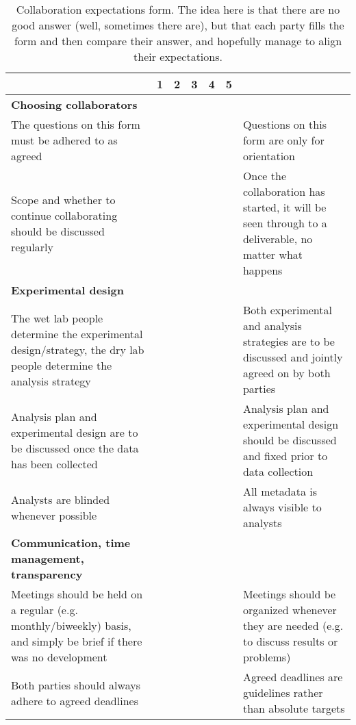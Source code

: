 \setlength\extrarowheight{4pt}

\begin{table}[!ht]
   \caption{Collaboration expectations form. The idea here is that there are no good answer (well, sometimes there are), but that each party fills the form and then compare their answer, and hopefully manage to align their expectations.}
    \label{form}
    \raggedleft
    \begin{adjustbox}{max width=\textwidth}
    \begin{tabular}{|p{3in}|l|l|l|l|l|p{3in}|}
    \hline
        ~ & 1 & 2 & 3 & 4 & 5 & ~ \tabularnewline \hline
        \textbf{Choosing collaborators} & ~ & ~ & ~ & ~ & ~ & ~ \tabularnewline \hline
        The questions on this form must be adhered to as agreed & ~ & ~ & ~ & ~ & ~ & Questions on this form are only for orientation \\ \hline
        Scope and whether to continue collaborating should be discussed regularly & ~ & ~ & ~ & ~ & ~ & Once the collaboration has started, it will be seen through to a deliverable, no matter what happens \\ \hline
        \textbf{Experimental design} & ~ & ~ & ~ & ~ & ~ & ~ \\ \hline
        The wet lab people determine the experimental design/strategy, the dry lab people determine the analysis strategy & ~ & ~ & ~ & ~ & ~ & Both experimental and analysis strategies are to be discussed and jointly agreed on by both parties \\ \hline
        Analysis plan and experimental design are to be discussed once the data has been collected & ~ & ~ & ~ & ~ & ~ & Analysis plan and experimental design should be discussed and fixed prior to data collection \\ \hline
        Analysts are blinded whenever possible & ~ & ~ & ~ & ~ & ~ & All metadata is always visible to analysts \\ \hline
        \textbf{Communication, time management, transparency} & ~ & ~ & ~ & ~ & ~ & ~ \\ \hline
        Meetings should be held on a regular (e.g. monthly/biweekly) basis, and simply be brief if there was no development & ~ & ~ & ~ & ~ & ~ & Meetings should be organized whenever they are needed (e.g. to discuss results or problems) \\ \hline
        Both parties should always adhere to agreed deadlines & ~ & ~ & ~ & ~ & ~ & Agreed deadlines are guidelines rather than absolute targets \\ \hline

\end{tabular}
\end{adjustbox}
\end{table}
